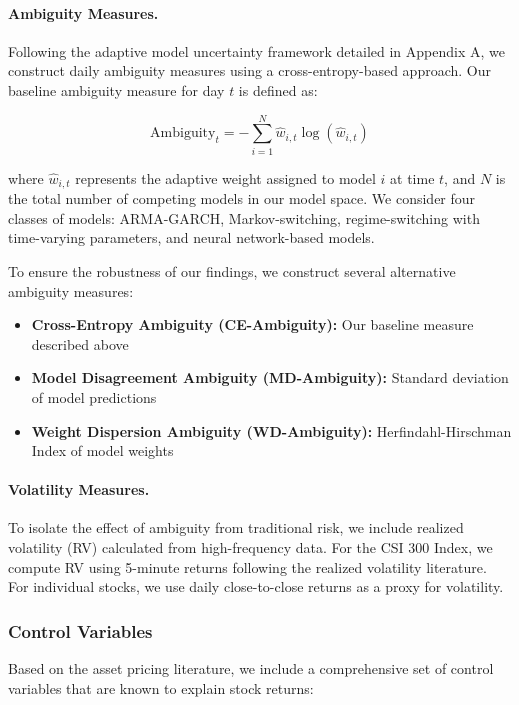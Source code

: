 \documentclass[preprint,12pt,authoryear]{elsarticle}
\begin{document}
\paragraph{Ambiguity Measures.}
Following the adaptive model uncertainty framework detailed in Appendix A, we construct daily ambiguity measures using a cross-entropy-based approach. Our baseline ambiguity measure for day $t$ is defined as:

\begin{equation}
\text{Ambiguity}_t = -\sum_{i=1}^{N} \hat{w}_{i,t} \log(\hat{w}_{i,t})
\end{equation}

where $\hat{w}_{i,t}$ represents the adaptive weight assigned to model $i$ at time $t$, and $N$ is the total number of competing models in our model space. We consider four classes of models: ARMA-GARCH, Markov-switching, regime-switching with time-varying parameters, and neural network-based models.

To ensure the robustness of our findings, we construct several alternative ambiguity measures:
\begin{itemize}
\item \textbf{Cross-Entropy Ambiguity (CE-Ambiguity):} Our baseline measure described above
\item \textbf{Model Disagreement Ambiguity (MD-Ambiguity):} Standard deviation of model predictions
\item \textbf{Weight Dispersion Ambiguity (WD-Ambiguity):} Herfindahl-Hirschman Index of model weights
\end{itemize}

\paragraph{Volatility Measures.}
To isolate the effect of ambiguity from traditional risk, we include realized volatility (RV) calculated from high-frequency data. For the CSI 300 Index, we compute RV using 5-minute returns following the realized volatility literature. For individual stocks, we use daily close-to-close returns as a proxy for volatility.

\subsubsection{Control Variables}

Based on the asset pricing literature, we include a comprehensive set of control variables that are known to explain stock returns:
\end{document}
